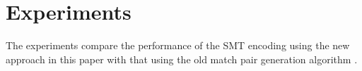 \section{Experiments}
The experiments compare the performance of the SMT encoding using the new approach in this paper with that using the old match pair generation algorithm \cite{}. 